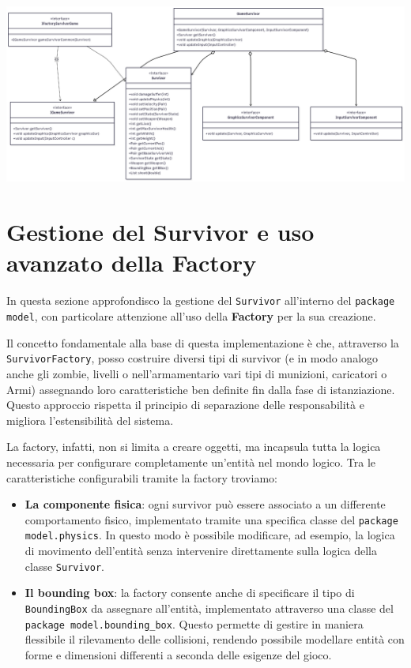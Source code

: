\documentclass[a4paper,12pt]{report}
\begin{document}
\begin{center}
\includegraphics[width=1.0\textwidth]{img/SurvivorGame.png}
\end{center}



\section{Gestione del Survivor e uso avanzato della Factory}

In questa sezione approfondisco la gestione del \texttt{Survivor} all'interno del \texttt{package model}, con particolare attenzione all'uso della \textbf{Factory} per la sua creazione.

Il concetto fondamentale alla base di questa implementazione è che, attraverso la \texttt{SurvivorFactory}, posso costruire diversi tipi di survivor (e in modo analogo anche gli zombie, livelli o nell'armamentario vari tipi di munizioni, caricatori o Armi) assegnando loro caratteristiche ben definite fin dalla fase di istanziazione. Questo approccio rispetta il principio di separazione delle responsabilità e migliora l’estensibilità del sistema.

La factory, infatti, non si limita a creare oggetti, ma incapsula tutta la logica necessaria per configurare completamente un'entità nel mondo logico. Tra le caratteristiche configurabili tramite la factory troviamo:

\begin{itemize}
    \item \textbf{La componente fisica}: ogni survivor può essere associato a un differente comportamento fisico, implementato tramite una specifica classe del \texttt{package model.physics}. In questo modo è possibile modificare, ad esempio, la logica di movimento dell'entità senza intervenire direttamente sulla logica della classe \texttt{Survivor}.
    
    \item \textbf{Il bounding box}: la factory consente anche di specificare il tipo di \texttt{BoundingBox} da assegnare all'entità, implementato attraverso una classe del \texttt{package model.bounding\_box}. Questo permette di gestire in maniera flessibile il rilevamento delle collisioni, rendendo possibile modellare entità con forme e dimensioni differenti a seconda delle esigenze del gioco.
\end{itemize}
\end{document}
